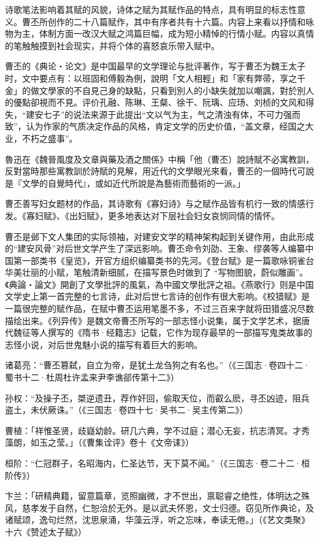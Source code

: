 诗歌笔法影响着其赋的风貌，诗体之赋为其赋作品的特点，具有明显的标志性意义。曹丕所创作的二十八篇赋作，其中有序者共有十六篇。内容上来看以抒情和咏物为主，体制方面一改汉大赋之鸿篇巨幅，成为短小精悼的行情小赋。内容以真情的笔触触摸到社会现实，并将个体的喜怒哀乐带入赋中。

曹丕的《典论‧论文》是中国最早的文学理论与批评著作，写于曹丕为魏王太子时，文中要点有：以班固和傅毅為例，說明「文人相輕」和「家有弊帚，享之千金」的做文學家的不自見己身的缺點，只看到別人的小缺失就加以嘲諷，對於別人的優點卻視而不見。评价孔融、陈琳、王粲、徐干、阮瑀、应玚、刘桢的文风和得失，“建安七子”的说法来源于此提出“文以气为主，气之清浊有体，不可力强而致”，认为作家的气质决定作品的风格，肯定文学的历史价值，“盖文章，经国之大业，不朽之盛事”。

魯迅在《魏晉風度及文章與藥及酒之關係》中稱「他（曹丕）說詩賦不必寓教訓，反對當時那些寓教訓於詩賦的見解，用近代的文學眼光來看，曹丕的一個時代可說是『文學的自覺時代』，或如近代所說是為藝術而藝術的一派。」

曹丕善写妇女题材的作品，其诗歌有《寡妇诗》与之赋作品皆有机行一致的情感行发。《寡妇赋》、《出妇赋》，更多地表达对下层社会妇女哀悯同情的情怀。

曹丕是邺下文人集团的实际领袖，对建安文学的精神架构起到关键作用，由此形成的“建安风骨”对后世文学产生了深远影响。曹丕命令刘劭、王象、缪袭等人编纂中国第一部类书《皇览》，开官方组织编纂类书的先河。《登台赋》是一篇歌咏铜雀台华美壮丽的小赋，笔触清新细腻，在描写景色时做到了 “写物图貌，蔚似雕画”。《典論‧論文》開創了文學批評的風氣，為中國文學批評之祖。《燕歌行》则是中国文学史上第一首完整的七言诗，此对后世七言诗的创作有很大影响。《校猎赋》是一篇很完整的赋作品，在赋中曹丕运用笔墨不多，不过三百来字就将田猎盛况尽数描绘出来。《列异传》是魏文帝曹丕所写的一部志怪小说集，属于文学艺术，据唐代魏征等人撰写的《隋书·经籍志》记载，它作为现存最早的一部描写鬼类故事的志怪小说，对后世鬼魅小说的描写有着巨大的影响。

诸葛亮：“曹丕篡弑，自立为帝，是犹土龙刍狗之有名也。”（《三国志·卷四十二·蜀书十二·杜周杜许孟来尹李谯郤传第十二》）

孙权：“及操子丕，桀逆遗丑，荐作奸回，偷取天位，而叡么麽，寻丕凶迹，阻兵盗土，未伏厥诛。”（《三国志·卷四十七·吴书二·吴主传第二》）

曹植：「祥惟圣贤，歧嶷幼龄。研几六典，学不过庭；潜心无妄，抗志清冥。才秀藻朗，如玉之莹。」（《曹集诠评》卷十《文帝诔》）

桓阶：“仁冠群子，名昭海内，仁圣达节，天下莫不闻。”（《三国志·卷二十二·桓阶传》）

卞兰：「研精典籍，留意篇章，览照幽微，才不世出，禀聪睿之绝性，体明达之殊风，慈孝发于自然，仁恕洽於无外。是以武夫怀恩，文士归德。窃见所作典论，及诸赋颂，逸句烂然，沈思泉涌，华藻云浮，听之忘味，奉读无倦。」（《艺文类聚》十六《赞述太子赋》）

